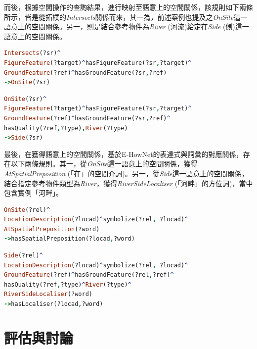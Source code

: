 而後，根據空間操作的查詢結果，進行映射至語意上的空間關係，該規則如下兩條所示，皆是從拓樸的\textit{Intersects}關係而來，其一為，前述案例也提及之\textit{OnSite}這一語意上的空間關係。另一，則是結合參考物件為\textit{River} (河流)給定在\textit{Side} (側)這一語意上的空間關係。

\begin{lstlisting}[language=Prolog, basicstyle=\ttfamily, xleftmargin=2em]
Intersects(?sr)^
FigureFeature(?target)^hasFigureFeature(?sr,?target)^
GroundFeature(?ref)^hasGroundFeature(?sr,?ref)
->OnSite(?sr)
\end{lstlisting}

\begin{lstlisting}[language=Prolog, basicstyle=\ttfamily, xleftmargin=2em]
OnSite(?sr)^
FigureFeature(?target)^hasFigureFeature(?sr,?target)^
GroundFeature(?ref)^hasGroundFeature(?sr,?ref)^
hasQuality(?ref,?type),River(?type)
->Side(?sr)
\end{lstlisting}

最後，在獲得語意上的空間關係，基於E-HowNet的表達式與詞彙的對應關係，存在以下兩條規則。其一，從\textit{OnSite}這一語意上的空間關係，獲得\textit{AtSpatialPreposition} (「在」的空間介詞)。另一，從\textit{Side}這一語意上的空間關係，結合指定參考物件類型為\textit{River}，獲得\textit{RiverSideLocaliser} (「河畔」的方位詞)，當中包含實例「河畔」。

\begin{lstlisting}[language=Prolog, basicstyle=\ttfamily, xleftmargin=2em]
OnSite(?rel)^
LocationDescription(?locad)^symbolize(?rel, ?locad)^
AtSpatialPreposition(?word)
->hasSpatialPreposition(?locad,?word)
\end{lstlisting}

\begin{lstlisting}[language=Prolog, basicstyle=\ttfamily, xleftmargin=2em]
Side(?rel)^
LocationDescription(?locad)^symbolize(?rel, ?locad)^
GroundFeature(?ref)^hasGroundFeature(?rel,?ref)^
hasQuality(?ref,?type)^River(?type)^
RiverSideLocaliser(?word)
->hasLocaliser(?locad,?word)
\end{lstlisting}

\section{評估與討論}

